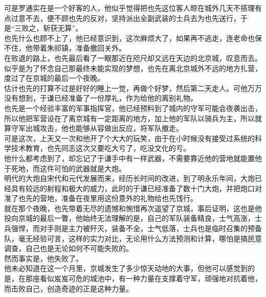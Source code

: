 \begin{multicols}{\theparacolNo}
可是罗通实在是一个好客的人，他似乎觉得把也先这位客人晾在城外几天不搭理有点过意不去，便不顾也先的反对，坚持派出全副武装的士兵去为也先送行，于是“三败之，斩获无算”。\\

也先什么也顾不上了，他已经意识到，这次麻烦大了，如果再不逃走，连老命也保不住，他带着朱祁镇，准备撤回关外。\\

在败退的路上，也先最后看了一眼那近在咫尺却又远在天边的北京城，叹息而去。\\

似乎是为了怀念自己那最终未能实现的梦想，也先在离北京城外不远的地方扎营，度过了在京城的最后一个夜晚。\\

估计也先的打算不过是好好的睡上一觉，再做个好梦，然后第二天走人。可他万万没有想到，于谦已经准备了一份厚礼，作为给他的离别礼物。\\

也先是一个经验丰富的军事指挥官，他已经预料到了城内的守军可能会夜袭出击，所以他把军营设在了离京城有一定距离的地方，加上他的军队以骑兵为主，所以就算守军出城攻击，他也能够从容做出反应，将军队撤走。\\

可是这次，上天又一次和他开了个大大的玩笑，由于在小时候没有接受过系统的科学技术教育，也先同志这次又要吃大亏了，吃没文化的亏。\\

他什么都考虑到了，却忘记了于谦手中有一样武器，不需要靠近他的营地就能置他于死地，而这件可怕的武器就是大炮。\\

明代的大炮自宋代和元代发展而来，经历长时间的改进，到了明永乐年间，大炮已经具有较远的射程和极大的威力，此时的于谦已经准备了数十门大炮，并把炮口对准了也先的营地，准备在夜里用这份意外的礼物给也先饯行。\\

就在那个夜晚，也先带着无尽的遗憾和惋惜再次遥望了京城，事后证明，这也是他投向京城的最后一瞥，他始终无法理解的是，自己的军队装备精良，士气高涨，士兵强悍，而对手则是主力被歼灭，装备不全，士气低落，士兵也是临时召集的预备队，毫无经验可言，这样的实力对比，无论用什么方法预测和计算，哪怕是搞民意调查，自己也是无论如何不可能失败的。\\

然而事实是，他失败了。\\

他未必知道在这一个月里，京城发生了多少惊天动地的大事，但他可以感觉到的是，在那座看似岌岌可危的城池中，有一种力量在支撑着守军，顽强地对抗着他，而击败自己，创造奇迹的正是这种力量。\\


\end{multicols}
